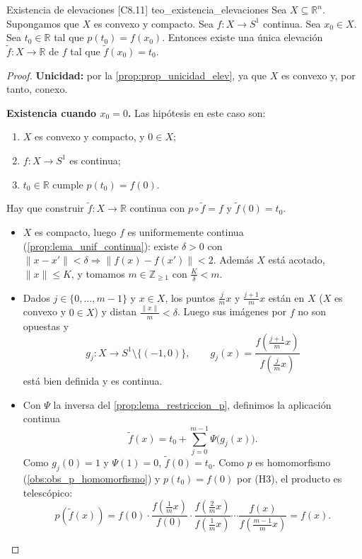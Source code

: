 \begin{teorema}{Existencia de elevaciones [C8.11] \marcaT}{teo_existencia_elevaciones}
Sea $X \subseteq \mathbb{R}^n$. Supongamos que $X$ es convexo y compacto. Sea $f: X \to S^1$ continua. Sea $x_0 \in X$. Sea $t_0 \in \mathbb{R}$ tal que $p(t_0) = f(x_0)$. Entonces existe una única elevación $\tilde{f} : X \to \mathbb{R}$ de $f$ tal que $\tilde{f}(x_0) = t_0$.
\end{teorema}

\begin{proof}
\textbf{Unicidad:} por la \cref{prop:prop_unicidad_elev}, ya que $X$ es convexo y, por tanto, conexo.

\textbf{Existencia cuando $x_0 = 0$.} Las hipótesis en este caso son:
\begin{enumerate}
    \item[(H1)] $X$ es convexo y compacto, y $0 \in X$;
    \item[(H2)] $f \colon X \to S^1$ es continua;
    \item[(H3)] $t_0 \in \mathbb{R}$ cumple $p(t_0) = f(0)$.
\end{enumerate}
Hay que construir $\tilde f \colon X \to \mathbb{R}$ continua con $p \circ \tilde f = f$ y $\tilde f(0) = t_0$.
\begin{itemize}
    \item $X$ es compacto, luego $f$ es uniformemente continua (\cref{prop:lema_unif_continua}): existe $\delta > 0$ con $\|x - x'\| < \delta \Rightarrow \|f(x) - f(x')\| < 2$. Además $X$ está acotado, $\|x\| \leq K$, y tomamos $m \in \mathbb{Z}_{\geq 1}$ con $\frac{K}{\delta} < m$.
    \item Dados $j \in \{0,\dots,m-1\}$ y $x \in X$, los puntos $\frac jm x$ y $\frac{j+1}{m}x$ están en $X$ ($X$ es convexo y $0 \in X$) y distan $\frac{\|x\|}{m} < \delta$. Luego sus imágenes por $f$ no son opuestas y
    \[ g_j \colon X \to S^1 \setminus \{(-1,0)\}, \qquad g_j(x) = \frac{f\left(\frac{j+1}{m}x\right)}{f\left(\frac jm x\right)} \]
    está bien definida y es continua.
    \item Con $\Psi$ la inversa del \cref{prop:lema_restriccion_p}, definimos la aplicación continua
    \[ \tilde f(x) = t_0 + \sum_{j=0}^{m-1} \Psi\big(g_j(x)\big). \]
    Como $g_j(0) = 1$ y $\Psi(1) = 0$, $\tilde f(0) = t_0$. Como $p$ es homomorfismo (\cref{obs:obs_p_homomorfismo}) y $p(t_0) = f(0)$ por (H3), el producto es telescópico:
    \[ p(\tilde f(x)) = f(0) \cdot \frac{f(\frac1m x)}{f(0)} \cdot \frac{f(\frac2m x)}{f(\frac1m x)} \cdots \frac{f(x)}{f(\frac{m-1}{m}x)} = f(x). \]
\end{itemize}


\end{proof}
